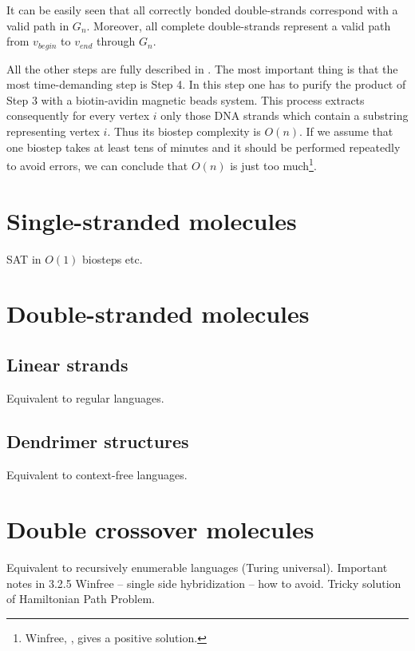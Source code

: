 	It can be easily seen that all correctly bonded double-strands correspond with a valid path in $G_n$. Moreover, all complete double-strands represent a valid path from $v_{begin}$ to $v_{end}$ through $G_n$.
	
	All the other steps are fully described in \cite{adleman94}. The most important thing is that the most time-demanding step is Step 4. In this step one has to purify the product of Step 3 with a biotin-avidin magnetic beads system. This process extracts consequently for every vertex $i$ only those DNA strands which contain a substring representing vertex $i$. Thus its biostep complexity is $O(n)$. If we assume that one biostep takes at least tens of minutes and it should be performed repeatedly to avoid errors, we can conclude that $O(n)$ is just too much\footnote{Winfree, \cite{winfree_phd}, gives a positive solution.}.

\section{Single-stranded molecules}
	
	SAT in $O(1)$ biosteps etc.

\section{Double-stranded molecules}
	
	\subsection{Linear strands}
		
		Equivalent to regular languages.
	
	\subsection{Dendrimer structures}
		
		Equivalent to context-free languages.

\section{Double crossover molecules}
	
	Equivalent to recursively enumerable languages (Turing universal). Important notes in 3.2.5 Winfree -- single side hybridization -- how to avoid. Tricky solution of Hamiltonian Path Problem.